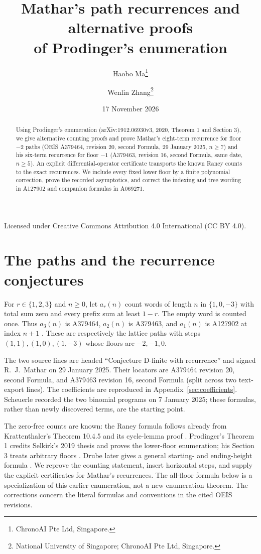 \documentclass[11pt]{article}
\title{Mathar's path recurrences and alternative proofs\\of Prodinger's enumeration}
\author{Haobo Ma\thanks{ChronoAI Pte Ltd, Singapore.}
\and Wenlin Zhang\thanks{National University of Singapore; ChronoAI Pte Ltd, Singapore.}}
\date{17 November 2026}
\begin{document}
\maketitle
\begin{center}\small Licensed under Creative Commons Attribution 4.0 International (CC BY 4.0).\end{center}
\begin{abstract}
Using Prodinger's enumeration (arXiv:1912.06930v3, 2020, Theorem 1 and
Section 3), we give alternative counting proofs and prove Mathar's eight-term
recurrence for floor $-2$ paths (OEIS A379464, revision 20, second Formula,
29 January 2025, $n\geq7$) and his six-term recurrence for floor $-1$
(A379463, revision 16, second Formula, same date, $n\geq5$).
An explicit differential-operator certificate transports the known Raney counts
to the exact recurrences. We include every fixed lower floor by a finite
polynomial correction, prove the recorded asymptotics, and correct the
indexing and tree wording in A127902 and companion formulas in A069271.
\end{abstract}

\section{The paths and the recurrence conjectures}
For $r\in\{1,2,3\}$ and $n\geq0$, let $a_r(n)$ count words of length $n$ in
$\{1,0,-3\}$ with total sum zero and every prefix sum at least $1-r$.
The empty word is counted once. Thus $a_3(n)$ is A379464, $a_2(n)$ is
A379463, and $a_1(n)$ is A127902 at index $n+1$ \cite{oeis3,oeis2,oeis1}.
These are respectively the lattice paths with steps $(1,1),(1,0),(1,-3)$
whose floors are $-2,-1,0$.

The two source lines are headed ``Conjecture D-finite with recurrence'' and
signed R.\ J.\ Mathar on 29 January 2025. Their locators are A379464
revision 20, second Formula, and A379463 revision 16, second Formula
(split across two text-export lines). The coefficients are reproduced in
Appendix~\ref{sec:coefficients}. Scheuerle recorded the two binomial programs
on 7 January 2025; these formulas, rather than newly discovered terms, are
the starting point.

The zero-free counts are known: the Raney formula follows already from
Krattenthaler's Theorem 10.4.5 and its cycle-lemma proof
\cite{krattenthaler}. Prodinger's Theorem 1 credits Selkirk's
2019 thesis and proves the lower-floor enumeration; his Section 3 treats
arbitrary floors \cite{prodinger}. Drube later gives a general starting- and
ending-height formula \cite[Theorem 2.3 and Corollary 2.4]{drube}.
We reprove the counting statement, insert horizontal steps, and supply the
explicit certificates for Mathar's recurrences. The all-floor formula below
is a specialization of this earlier enumeration, not a new enumeration theorem.
The corrections concern the literal formulas and conventions in the cited
OEIS revisions.
\end{document}
